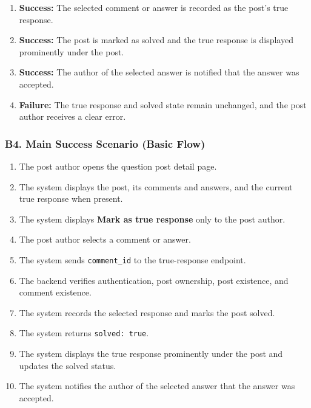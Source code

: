 \documentclass[12pt]{article}
\begin{document}
\begin{enumerate}
\item \textbf{Success:} The selected comment or answer is recorded as the post's true response.
\item \textbf{Success:} The post is marked as solved and the true response is displayed prominently under the post.
\item \textbf{Success:} The author of the selected answer is notified that the answer was accepted.
\item \textbf{Failure:} The true response and solved state remain unchanged, and the post author receives a clear error.
\end{enumerate}
\par\medskip

\hypertarget{sec:b4-main-success-scenario-basic-flow}{}
\subsubsection*{B4. Main Success Scenario (Basic Flow)}
\par\medskip

\begin{enumerate}
\item The post author opens the question post detail page.
\item The system displays the post, its comments and answers, and the current true response when present.
\item The system displays \textbf{Mark as true response} only to the post author.
\item The post author selects a comment or answer.
\item The system sends \texttt{comment\_id} to the true-response endpoint.
\item The backend verifies authentication, post ownership, post existence, and comment existence.
\item The system records the selected response and marks the post solved.
\item The system returns \texttt{solved: true}.
\item The system displays the true response prominently under the post and updates the solved status.
\item The system notifies the author of the selected answer that the answer was accepted.
\end{enumerate}
\par\medskip
\end{document}
